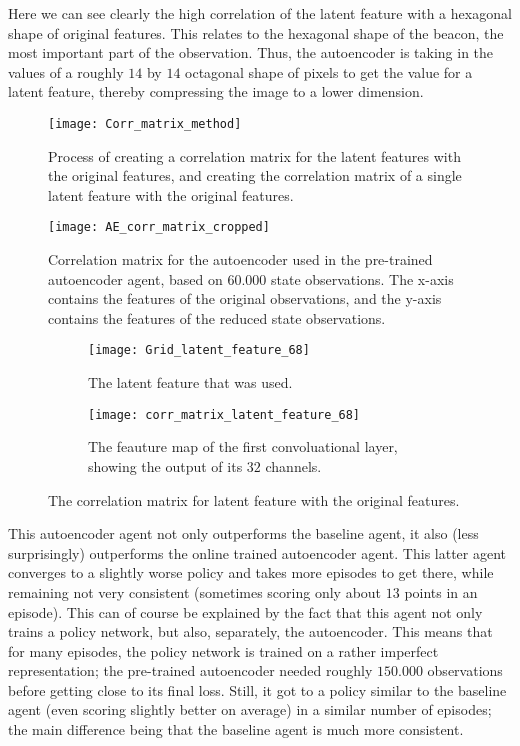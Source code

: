 Here we can see clearly the high correlation of the latent feature with a hexagonal shape of original features. This relates to the hexagonal shape of the beacon, the most important part of the observation. Thus, the autoencoder is taking in the values of a roughly $14$ by $14$ octagonal shape of pixels to get the value for a latent feature, thereby compressing the image to a lower dimension.

\begin{figure}[h!]
	\centering
	\texttt{[image: Corr\_matrix\_method]}
	\caption{Process of creating a correlation matrix for the latent features with the original features, and creating the correlation matrix of a single latent feature with the original features.}
	\label{fig:ae-corr-process}
\end{figure}

\begin{figure}[h!]
	\centering
	\texttt{[image: AE\_corr\_matrix\_cropped]}
	\caption{Correlation matrix for the autoencoder used in the pre-trained autoencoder agent, based on $60.000$ state observations. The x-axis contains the features of the original observations, and the y-axis contains the features of the reduced state observations.}
	\label{fig:ae-corr}
\end{figure}

\begin{figure}[h!]
	\centering
	\begin{subfigure}[b]{1\textwidth}
		\texttt{[image: Grid\_latent\_feature\_68]}
		\caption{The latent feature that was used.}
		\label{fig:ae-latent-feature} 
	\end{subfigure}
	\begin{subfigure}[b]{1\textwidth}
		\texttt{[image: corr\_matrix\_latent\_feature\_68]}
		\caption{The feauture map of the first convoluational layer, showing the output of its $32$ channels.}
		\label{fig:ae-latent-feature-corr-matrix}
	\end{subfigure}
	\caption{The correlation matrix for latent feature with the original features.}
	\label{fig:latent-feature-corr}
\end{figure}

This autoencoder agent not only outperforms the baseline agent, it also (less surprisingly) outperforms the online trained autoencoder agent. This latter agent converges to a slightly worse policy and takes more episodes to get there, while remaining not very consistent (sometimes scoring only about $13$ points in an episode). This can of course be explained by the fact that this agent not only trains a policy network, but also, separately, the autoencoder. This means that for many episodes, the policy network is trained on a rather imperfect representation; the pre-trained autoencoder needed roughly $150.000$ observations before getting close to its final loss. Still, it got to a policy similar to the baseline agent (even scoring slightly better on average) in a similar number of episodes; the main difference being that the baseline agent is much more consistent. %

